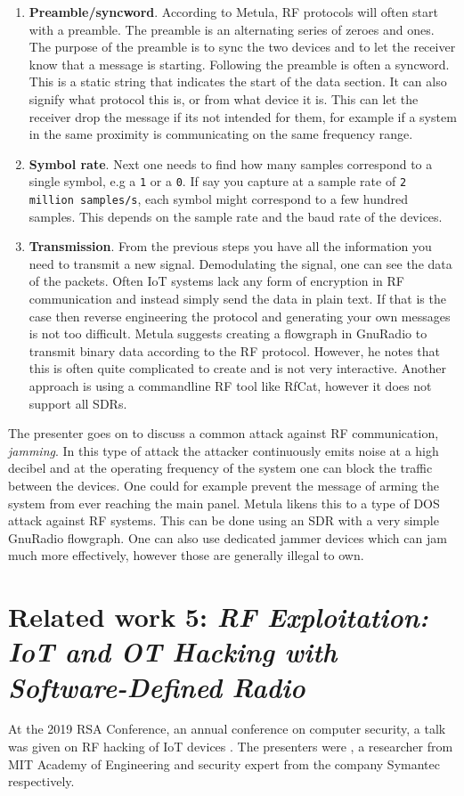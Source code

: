 \begin{enumerate}
    \item \textbf{Preamble/syncword}. According to Metula, RF protocols will often start with a preamble. The preamble is an alternating series of zeroes and ones. The purpose of the preamble is to sync the two devices and to let the receiver know that a message is starting. Following the preamble is often a syncword. This is a static string that indicates the start of the data section. It can also signify what protocol this is, or from what device it is. This can let the receiver drop the message if its not intended for them, for example if a system in the same proximity is communicating on the same frequency range.
    
    \item \textbf{Symbol rate}. Next one needs to find how many samples correspond to a single symbol, e.g a \texttt{1} or a \texttt{0}. If say you capture at a sample rate of \texttt{2 million samples/s}, each symbol might correspond to a few hundred samples. This depends on the sample rate and the baud rate of the devices.
    
    \item \textbf{Transmission}. From the previous steps you have all the information you need to transmit a new signal. Demodulating the signal, one can see the data of the packets. Often IoT systems lack any form of encryption in RF communication and instead simply send the data in plain text. If that is the case then reverse engineering the protocol and generating your own messages is not too difficult. Metula suggests creating a flowgraph in GnuRadio to transmit binary data according to the RF protocol. However, he notes that this is often quite complicated to create and is not very interactive. Another approach is using a commandline RF tool like RfCat, however it does not support all SDRs.
\end{enumerate}
The presenter goes on to discuss a common attack against RF communication, \textit{jamming}. In this type of attack the attacker continuously emits noise at a high decibel and at the operating frequency of the system one can block the traffic between the devices. One could for example prevent the message of arming the system from ever reaching the main panel. Metula likens this to a type of \gls{DOS} attack against RF systems. This can be done using an SDR with a very simple GnuRadio flowgraph. One can also use dedicated jammer devices which can jam much more effectively, however those are generally illegal to own.

\section{Related work 5: \textit{RF Exploitation: IoT and OT Hacking with Software-Defined Radio}} \label{ch:related-work:rf-exploit}
At the 2019 RSA Conference, an annual conference on computer security, a talk was given on RF hacking of IoT devices \cite{rf-exploitation-talk}. The presenters were \citeauthor{rf-exploitation-talk}, a researcher from MIT Academy of Engineering and security expert from the company Symantec respectively.

